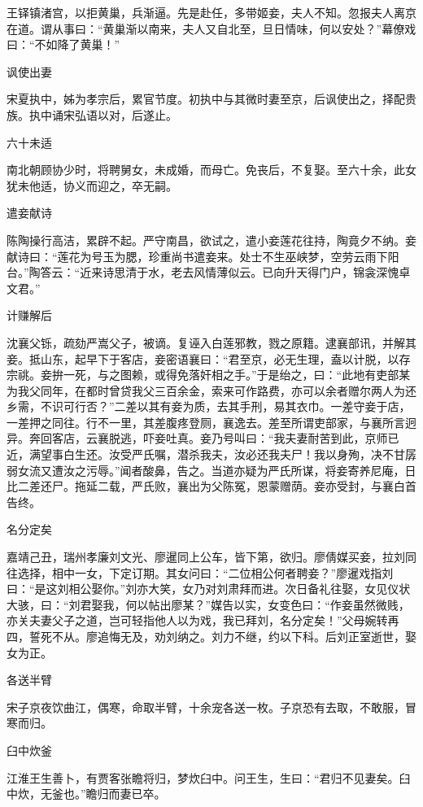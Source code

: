 \documentclass[a4paper,12pt,UTF8,twoside]{ctexbook}
\begin{document}
    王铎镇渚宫，以拒黄巢，兵渐逼。先是赴任，多带姬妾，夫人不知。忽报夫人离京在道。谓从事曰：“黄巢渐以南来，夫人又自北至，旦日情味，何以安处？”幕僚戏曰：“不如降了黄巢！”
    
    讽使出妻
    
    宋夏执中，姊为孝宗后，累官节度。初执中与其微时妻至京，后讽使出之，择配贵族。执中诵宋弘语以对，后遂止。
    
    六十未适
    
    南北朝顾协少时，将聘舅女，未成婚，而母亡。免丧后，不复娶。至六十余，此女犹未他适，协义而迎之，卒无嗣。
    
    遣妾献诗
    
    陈陶操行高洁，累辟不起。严守南昌，欲试之，遣小妾莲花往持，陶竟夕不纳。妾献诗曰：“莲花为号玉为腮，珍重尚书遣妾来。处士不生巫峡梦，空劳云雨下阳台。”陶答云：“近来诗思清于水，老去风情薄似云。已向升天得门户，锦衾深愧卓文君。”
    
    计赚解后
    
    沈襄父铄，疏劾严嵩父子，被谪。复诬入白莲邪教，戮之原籍。逮襄部讯，并解其妾。抵山东，起早下于客店，妾密语襄曰：“君至京，必无生理，盍以计脱，以存宗祧。妾拚一死，与之图赖，或得免落奸相之手。”于是绐之，曰：“此地有吏部某为我父同年，在都时曾贷我父三百余金，索来可作路费，亦可以余者赠尔两人为还乡需，不识可行否？”二差以其有妾为质，去其手刑，易其衣巾。一差守妾于店，一差押之同往。行不一里，其差腹疼登厕，襄逸去。差至所谓吏部家，与襄所言迥异。奔回客店，云襄脱逃，吓妾吐真。妾乃号叫曰：“我夫妻耐苦到此，京师已近，满望事白生还。汝受严氏嘱，潜杀我夫，汝必还我夫尸！我以身殉，决不甘孱弱女流又遭汝之污辱。”闻者酸鼻，告之。当道亦疑为严氏所谋，将妾寄养尼庵，日比二差还尸。拖延二载，严氏败，襄出为父陈冤，恩蒙赠荫。妾亦受封，与襄白首告终。
    
    名分定矣
    
    嘉靖己丑，瑞州孝廉刘文光、廖暹同上公车，皆下第，欲归。廖倩媒买妾，拉刘同往选择，相中一女，下定订期。其女问曰：“二位相公何者聘妾？”廖暹戏指刘曰：“是这刘相公娶你。”刘亦大笑，女乃对刘肃拜而进。次日备礼往娶，女见仪状大骇，曰：“刘君娶我，何以帖出廖某？”媒告以实，女变色曰：“作妾虽然微贱，亦关夫妻父子之道，岂可轻指他人以为戏，我已拜刘，名分定矣！”父母婉转再四，誓死不从。廖追悔无及，劝刘纳之。刘力不继，约以下科。后刘正室逝世，娶女为正。
    
    各送半臂
    
    宋子京夜饮曲江，偶寒，命取半臂，十余宠各送一枚。子京恐有去取，不敢服，冒寒而归。
    
    臼中炊釜
    
    江淮王生善卜，有贾客张瞻将归，梦炊臼中。问王生，生曰：“君归不见妻矣。臼中炊，无釜也。”瞻归而妻已卒。
    
\end{document}
